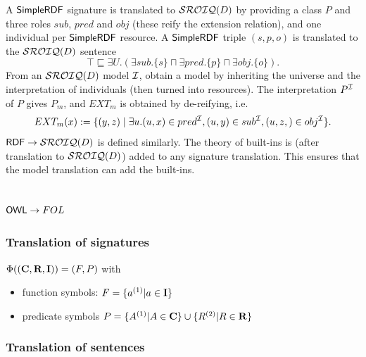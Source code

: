 \documentclass[10pt,fleqn,final]{scrreprt}
\newcommand{\ssclause}[1]{\subsection{#1}}
\newcommand{\sssclause}[1]{\subsubsection{#1}}
\newenvironment{definitions}[0]{\medskip }{}
\begin{document}
\begin{definitions}
A $\mathsf{SimpleRDF}$ signature is translated to $\mathcal{SROIQ}(D)$ by providing a class
$P$ and three roles $sub$, $pred$ and $obj$ (these reify the extension
relation), and one individual per $\mathsf{SimpleRDF}$ resource. A $\mathsf{SimpleRDF}$ triple
$(s,p,o)$ is translated to the $\mathcal{SROIQ}(D)$ sentence
   $$\top \sqsubseteq \exists U. (\exists sub. \{s\} \sqcap \exists pred. \{p\} \sqcap  \exists obj. \{o\} ).$$
  From an $\mathcal{SROIQ}(D)$ model ${\cal I}$, obtain a \SimpleRDF model by inheriting the universe
  and the interpretation of individuals (then turned into resources).
  The interpretation $P^{\cal I}$ of $P$ gives $P_m$, and $EXT_m$ is obtained
  by de-reifying,
 i.e.\ $$EXT_{m}(x):=\{(y,z) \mid \exists u . (u,x)\in pred^{\cal I},
  (u,y)\in sub^{\cal I}, (u,z,)\in obj^{\cal I} \}.$$
  $\mathsf{RDF} \rightarrow \mathcal{SROIQ}(D)$ is defined similarly. The theory of \RDF built-ins 
  is (after translation to $\mathcal{SROIQ}(D)$) added to any signature translation.
  This ensures that the model translation can add the built-ins.

\ssclause{$\mathsf{OWL} \rightarrow FOL$}

\sssclause{Translation of signatures}

 $\Phi((\textbf{C}, \textbf{R}, \textbf{I})) =  (F, P)$ with
\begin{itemize}
	\item function symbols: $F = \{a^{(1)} \vert a \in \textbf{I}\}$
	\item predicate symbols $P = \{A^{(1)} \vert A \in \mathbf{C} \} \cup \{ R^{(2)} \vert R \in \mathbf{R}\}$
\end{itemize}


\sssclause{Translation of sentences}


\end{definitions}
\end{document}
